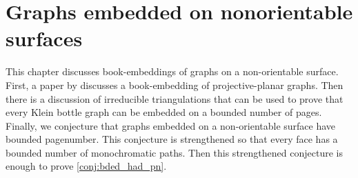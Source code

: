 \chapter{Graphs embedded on nonorientable surfaces}\label{chap:nonorientable}

This chapter discusses book-embeddings of graphs on a non-orientable surface. First, a paper by \textcite{nakamotoBookEmbeddingProjectiveplanar2015} discusses a book-embedding of projective-planar graphs. Then there is a discussion of irreducible triangulations that can be used to prove that every Klein bottle graph can be embedded on a bounded number of pages. Finally, we conjecture that graphs embedded on a non-orientable surface have bounded pagenumber. This conjecture is strengthened so that every face has a bounded number of monochromatic paths. Then this strengthened conjecture is enough to prove \cref{conj:bded_had_pn}.



%


